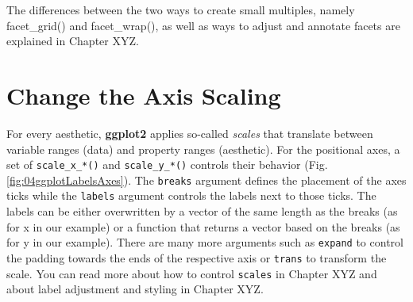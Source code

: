 \documentclass[
]{krantz}
\begin{document}
The differences between the two ways to create small multiples, namely facet\_grid() and facet\_wrap(), as well as ways to adjust and annotate facets are explained in Chapter XYZ.

\hypertarget{axis-scaling}{%
\section{Change the Axis Scaling}\label{axis-scaling}}

For every aesthetic, \textbf{ggplot2} applies so-called \emph{scales} that translate between variable ranges (data) and property ranges (aesthetic). For the positional axes, a set of \texttt{scale\_x\_*()} and \texttt{scale\_y\_*()} controls their behavior (Fig. \ref{fig:04ggplotLabelsAxes}). The \texttt{breaks} argument defines the placement of the axes ticks while the \texttt{labels} argument controls the labels next to those ticks. The labels can be either overwritten by a vector of the same length as the breaks (as for x in our example) or a function that returns a vector based on the breaks (as for y in our example). There are many more arguments such as \texttt{expand} to control the padding towards the ends of the respective axis or \texttt{trans} to transform the scale. You can read more about how to control \texttt{scales} in Chapter XYZ and about label adjustment and styling in Chapter XYZ.
\end{document}
